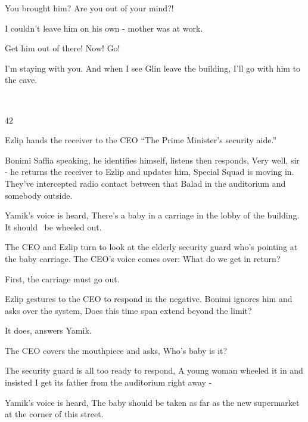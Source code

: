 \documentclass[letterpaper]{article}
\begin{document}
{\textquotedbl}You brought him? Are you out of your mind?!{\textquotedbl} 

{\textquotedbl}I couldn't leave him on his own \textcolor[rgb]{0.0,0.4392157,0.7529412}{{}-} mother was at
work.{\textquotedbl} 

{\textquotedbl}Get him out of there! Now! Go!{\textquotedbl} 

{\textquotedbl}I'm staying with you. And when I see Glin leave the building, I'll go with him to the
cave.{\textquotedbl} 

~

42 

Ezlip hands the receiver to the CEO ``The Prime Minister's security aide.'' 

{\textquotedbl}Bonimi Saffia speaking,{\textquotedbl} he identifies himself, listens then responds, {\textquotedbl}Very
well, sir -{\textquotedbl} he returns the receiver to Ezlip and updates him, {\textquotedbl}Special Squad is moving in.
They've intercepted radio contact between that Balad in the auditorium and somebody outside.{\textquotedbl} 

Yamik's voice is heard, {\textquotedbl}There's a baby in a carriage in the lobby of the building. It should \ be wheeled
out.{\textquotedbl}

The CEO and Ezlip turn to look at the elderly security\textcolor[rgb]{0.0,0.4392157,0.7529412}{ }guard who's pointing at
the baby carriage. The CEO's voice comes over: {\textquotedbl}What do we get in return?{\textquotedbl} 

{\textquotedbl}First, the carriage must go out.{\textquotedbl} 

Ezlip gestures to the CEO to respond in the negative. Bonimi ignores him and asks over the system, {\textquotedbl}Does
this time span extend beyond the limit?{\textquotedbl}

{\textquotedbl}It does,{\textquotedbl} answers Yamik\textcolor[rgb]{0.0,0.4392157,0.7529412}{.}

The CEO covers the mouthpiece and asks, {\textquotedbl}Who's baby is it?{\textquotedbl} 

The security guard is all too ready to respond, {\textquotedbl}A young\textcolor[rgb]{0.0,0.4392157,0.7529412}{ }woman
wheeled it in and insisted I get its father from the auditorium right away -{\textquotedbl} 

Yamik's voice is heard, {\textquotedbl}The baby should be taken as far as the new supermarket at the corner of this
street.{\textquotedbl}
\end{document}
